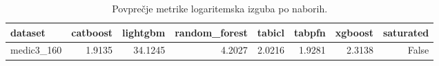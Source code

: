 \begin{table}[htbp]
\centering
\caption{Povprečje metrike logaritemska izguba po naborih.}
\label{tab:pivot}
\begin{tabular}{lrrrrrrr}
\hline
dataset & catboost & lightgbm & random\_forest & tabicl & tabpfn & xgboost & saturated \\
\hline
medic3\_160 & 1.9135 & 34.1245 & 4.2027 & 2.0216 & 1.9281 & 2.3138 & False \\
\hline
\end{tabular}
\end{table}
